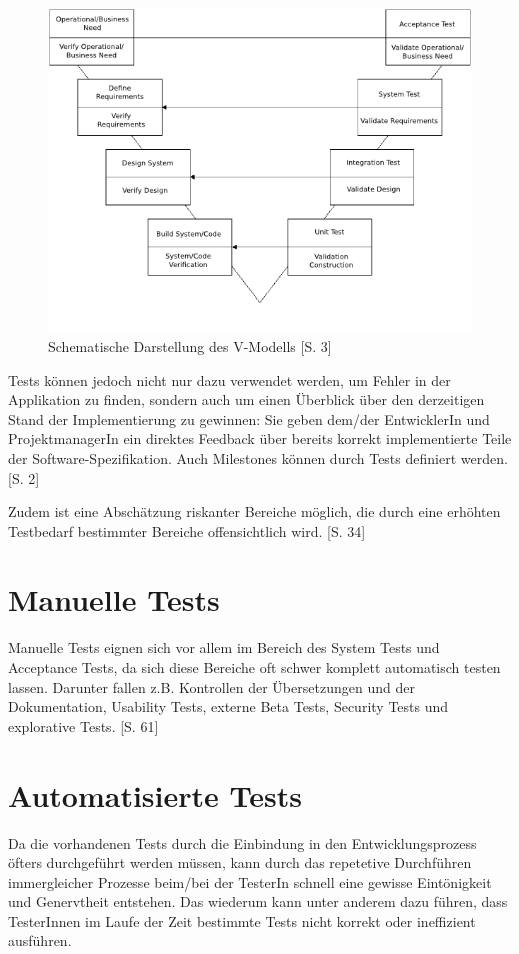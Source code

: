 \documentclass[a4paper,bibtotoc,oneside]{scrbook}
\begin{document}
\begin{figure}[h!]
\centering
\includegraphics[width=120mm]{img/vmodel.png}
\caption[Schematische Darstellung des V-Modells]{Schematische Darstellung des V-Modells \cite{vmodel}[S. 3]}\label{Abb3}
\end{figure}

Tests können jedoch nicht nur dazu verwendet werden, um Fehler in der Applikation zu finden, sondern auch um einen Überblick über den derzeitigen Stand der Implementierung zu gewinnen: Sie geben dem/der EntwicklerIn und ProjektmanagerIn ein direktes Feedback über bereits korrekt implementierte Teile der Software-Spezifikation. Auch Milestones können durch Tests definiert werden. \cite{test_auto}[S. 2]

Zudem ist eine Abschätzung riskanter Bereiche möglich, die durch eine erhöhten Testbedarf bestimmter Bereiche offensichtlich wird. \cite{testing_apps_on_web}[S. 34]


\section{Manuelle Tests}
Manuelle Tests eignen sich vor allem im Bereich des System Tests und Acceptance Tests, da sich diese Bereiche oft schwer komplett automatisch testen lassen. Darunter fallen z.B. Kontrollen der Übersetzungen und der Dokumentation, Usability Tests, externe Beta Tests, Security Tests und explorative Tests. \cite{test_large_systems}[S. 61]


\section{Automatisierte Tests}
Da die vorhandenen Tests durch die Einbindung in den Entwicklungsprozess öfters durchgeführt werden müssen, kann durch das repetetive Durchführen immergleicher Prozesse beim/bei der TesterIn schnell eine gewisse Eintönigkeit und Genervtheit entstehen. Das wiederum kann unter anderem dazu führen, dass TesterInnen im Laufe der Zeit bestimmte Tests nicht korrekt oder ineffizient ausführen. 
\end{document}
